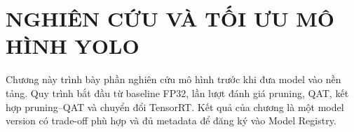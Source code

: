 \chapter{NGHIÊN CỨU VÀ TỐI ƯU MÔ HÌNH YOLO}

Chương này trình bày phần nghiên cứu mô hình trước khi đưa model vào nền tảng.
Quy trình bắt đầu từ baseline FP32, lần lượt đánh giá pruning, QAT, kết hợp
pruning--QAT và chuyển đổi TensorRT. Kết quả của chương là một model version có
trade-off phù hợp và đủ metadata để đăng ký vào Model Registry.








